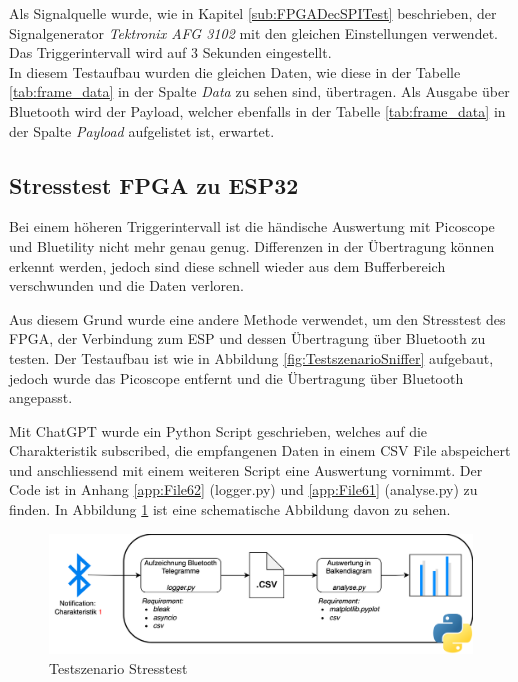 Als Signalquelle wurde, wie in Kapitel \ref{sub:FPGADecSPITest} beschrieben, der Signalgenerator \textit{Tektronix AFG 3102} mit den gleichen Einstellungen verwendet. Das Triggerintervall wird auf 3 Sekunden eingestellt.\\
In diesem Testaufbau wurden die gleichen Daten, wie diese in der Tabelle \ref{tab:frame_data} in der Spalte \textit{Data} zu sehen sind, übertragen. Als Ausgabe über Bluetooth wird der Payload, welcher ebenfalls in der Tabelle \ref{tab:frame_data} in der Spalte \textit{Payload} aufgelistet ist, erwartet.


\subsection{Stresstest FPGA zu ESP32}
\label{sub:MethStesstest}

Bei einem höheren Triggerintervall ist die händische Auswertung mit Picoscope und Bluetility nicht mehr genau genug. Differenzen in der Übertragung können erkennt werden, jedoch sind diese schnell wieder aus dem Bufferbereich verschwunden und die Daten verloren.

Aus diesem Grund wurde eine andere Methode verwendet, um den Stresstest des FPGA, der Verbindung zum ESP und dessen Übertragung über Bluetooth zu testen. Der Testaufbau ist wie in Abbildung \ref{fig:TestszenarioSniffer} aufgebaut, jedoch wurde das Picoscope entfernt und die Übertragung über Bluetooth angepasst. 

Mit ChatGPT wurde ein Python Script geschrieben, welches auf die Charakteristik subscribed, die empfangenen Daten in einem CSV File abspeichert und anschliessend mit einem weiteren Script eine Auswertung vornimmt. Der Code ist in Anhang \ref{app:File62} (logger.py) und \ref{app:File61} (analyse.py) zu finden. In Abbildung \ref{fig:TestszStresstest} ist eine schematische Abbildung davon zu sehen. 

\begin{figure}[H]
    \centering
    \includegraphics[width=0.9\linewidth]{Figures/Chap3/Testszenarien/Testszenario_Stresstest.png}
    \caption{Testszenario Stresstest}
    \label{fig:TestszStresstest}
\end{figure}

